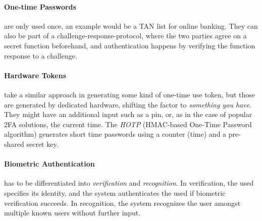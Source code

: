 \paragraph{One-time Passwords} are only used once, an example would be a TAN
list for online banking. They can also be part of a challenge-response-protocol,
where the two parties agree on a secret function beforehand, and authentication
happens by verifying the function response to a challenge.

\paragraph{Hardware Tokens} take a similar approach in generating some kind of
one-time use token, but those are generated by dedicated hardware, shifting the
factor to \textit{something you have}. They might have an additional input such
as a pin, or, as in the case of popular 2FA solutions, the current time. The
\emph{HOTP} (HMAC-based One-Time Password algorithm) generates short time
passwords using a counter (time) and a pre-shared secret key.

\paragraph{Biometric Authentication} has to be differentiated into
\textit{verification} and \textit{recognition}. In verification, the used
specifies its identity, and the system authenticates the used if biometric
verification succeeds. In recognition, the system recognizes the user amongst
multiple known users without further input.

